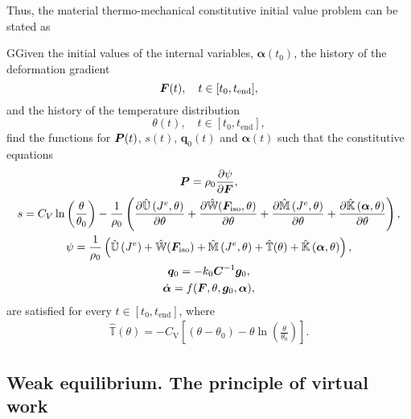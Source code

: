 Thus, the material thermo-mechanical constitutive initial value problem can be stated as
    \begin{problem}
    GGiven the initial values of the internal variables, $\bm \alpha(t_0)$, the history of the deformation gradient
    \begin{equation}
        \bm{F}(t),\quad t\in[t_0,t_\text{end}],
    \end{equation}
    and the history of the temperature distribution
    \begin{equation}
    \theta(t),\quad t\in[t_0,t_\text{end}],
    \end{equation}
    find the functions for $\bm{P}(t)$, \(s(t)\), \(\bm q_0(t)\) and $\bm \alpha(t)$ such that the constitutive equations
    \begin{gather}
        \bm{P} = \rho_0 \frac{\partial \psi}{\partial \bm{F}},\\
        s = C_{V} \ln \left(\frac{\theta}{\theta_{0}}\right)-\frac{1}{\rho_{0}}\left(\frac{\partial \hat{\mathbb{U}}\left(J^e,\theta\right)}{\partial \theta} + \frac{\partial \hat{\mathbb{W}}(\bm{F}_\text{iso},\theta)}{\partial \theta} + \frac{\partial \hat{\mathbb{M}}\left(J^{e}, \theta\right)}{\partial \theta}+\frac{\partial \hat{\mathbb{K}}\left(\bm \alpha, \theta\right)}{\partial \theta}\right),\\
        \psi =\frac{1}{\rho_0}\left( \hat{\mathbb{U}}\left(J^{e}\right)+\hat{\mathbb{W}}(\bm F_\text{iso})+\hat{\mathbb{M}}\left(J^{e}, \theta\right)+\hat{\mathbb{T}}(\theta)+\hat{\mathbb{K}}\left(\boldsymbol{\alpha}, \theta\right)\right),\\
        \bm q_0 = - k_0 \bm C^{-1} \bm g_0,\\
        \dot{\bm \alpha} = f(\bm{F}, \theta, \bm g_0 ,\bm \alpha),
    \end{gather}
    are satisfied for every $t\in [t_0, t_\text{end}]$, where
    \begin{gather}
    \hat{\mathbb T}(\theta) = - C_{\mathrm{V}}\left[\left(\theta-\theta_{0}\right)-\theta \ln \left(\frac{\theta}{\theta_{0}}\right)\right].
    \end{gather}
    \end{problem}

\subsection{Weak equilibrium. The principle of virtual work}

